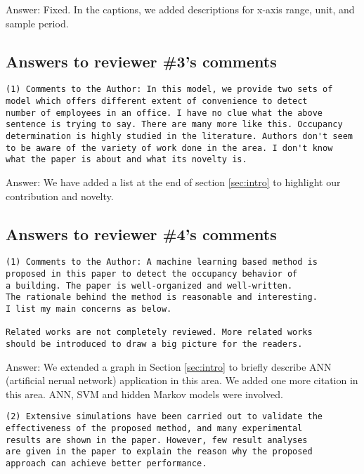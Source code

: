 Answer: Fixed. In the captions, we added descriptions for x-axis range, unit, and
sample period.

\subsection{Answers to reviewer \#3's comments}
\begin{verbatim}
(1) Comments to the Author: In this model, we provide two sets of
model which offers different extent of convenience to detect
number of employees in an office. I have no clue what the above
sentence is trying to say. There are many more like this. Occupancy
determination is highly studied in the literature. Authors don't seem
to be aware of the variety of work done in the area. I don't know
what the paper is about and what its novelty is.
\end{verbatim}

Answer: We have added a list at the end of section \ref{sec:intro} to
highlight our contribution and novelty.

\subsection{Answers to reviewer \#4's comments}
\begin{verbatim}
(1) Comments to the Author: A machine learning based method is
proposed in this paper to detect the occupancy behavior of
a building. The paper is well-organized and well-written.
The rationale behind the method is reasonable and interesting.
I list my main concerns as below.

Related works are not completely reviewed. More related works
should be introduced to draw a big picture for the readers.
\end{verbatim}

Answer: We extended a graph in Section \ref{sec:intro} to briefly describe
ANN (artificial nerual network) application in this area. We added one more
citation in this area. ANN, SVM and hidden Markov models were involved.


\begin{verbatim}
(2) Extensive simulations have been carried out to validate the
effectiveness of the proposed method, and many experimental
results are shown in the paper. However, few result analyses
are given in the paper to explain the reason why the proposed
approach can achieve better performance.
\end{verbatim}

